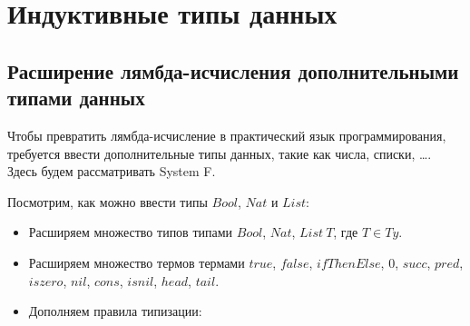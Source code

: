 \section{Индуктивные типы данных}

\subsection{Расширение лямбда-исчисления дополнительными типами данных}

Чтобы превратить лямбда-исчисление в практический язык программирования,
требуется ввести дополнительные типы данных, такие как числа, списки, \dots.
Здесь будем рассматривать System F.

Посмотрим, как можно ввести типы \(Bool\), \(Nat\) и \(List\)\cite{tapl}:
\begin{itemize}
\item Расширяем множество типов типами \(Bool\), \(Nat\), \(List\ T\), где \(T \in Ty\).
\item Расширяем множество термов термами \(true\), \(false\), \(ifThenElse\),
   \(0\), \(succ\), \(pred\), \(iszero\),
   \(nil\), \(cons\), \(isnil\), \(head\), \(tail\).
\item Дополняем правила типизации:
   \begin{prooftree}
   \end{prooftree}
   \begin{prooftree}
   \end{prooftree}
   \begin{prooftree}
   \end{prooftree}

   \begin{prooftree}
   \end{prooftree}
   \begin{prooftree}
   \end{prooftree}
   \begin{prooftree}
   \end{prooftree}
   \begin{prooftree}
   \end{prooftree}


\end{itemize}
